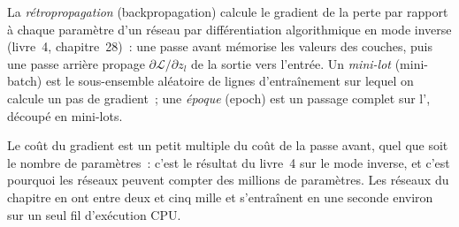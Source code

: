 \begin{omfigure}

\label{fig:ml:nets:mlp}
\end{omfigure}

\begin{definition}\label{def:ml:neural-networks-for-noisy-tabular-data:backprop}
La \emph{rétropropagation} (backpropagation) calcule le gradient de la perte par rapport à chaque paramètre d'un
réseau par différentiation algorithmique en mode inverse (livre~4, chapitre~28)~: une passe avant mémorise les valeurs des
couches, puis une passe arrière propage $\partial\mathcal L/\partial z_l$ de la sortie vers l'entrée. Un \emph{mini-lot} (mini-batch)
est le sous-ensemble aléatoire de lignes d'entraînement sur lequel on calcule un pas de gradient~; une \emph{époque} (epoch) est un passage
complet sur l', découpé en mini-lots.
\end{definition}

Le coût du gradient est un petit multiple du coût de la passe avant, quel que soit le nombre de paramètres~: c'est le
résultat du livre~4 sur le mode inverse, et c'est pourquoi les réseaux peuvent compter des millions de paramètres. Les réseaux du chapitre en ont entre deux et
cinq mille et s'entraînent en une seconde environ sur un seul fil d'exécution CPU.

